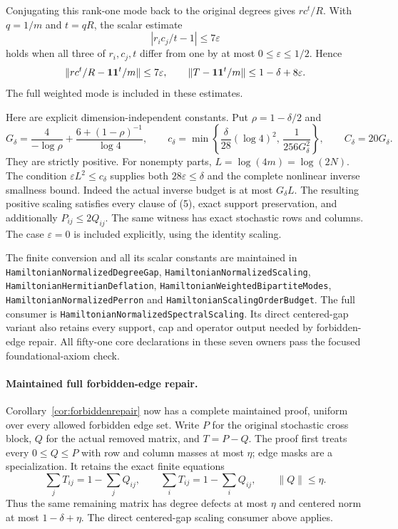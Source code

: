 Conjugating this rank-one mode back to the original degrees gives
\(rc^t/R\). With \(q=1/m\) and \(t=qR\), the scalar estimate
\[
 |r_i c_j/t-1|\leq7\varepsilon
\]
holds when all three of \(r_i,c_j,t\) differ from one by at most
\(0\leq\varepsilon\leq1/2\). Hence
\[
 \|rc^t/R-\mathbf1\mathbf1^t/m\|\leq7\varepsilon,\qquad
 \|T-\mathbf1\mathbf1^t/m\|\leq1-\delta+8\varepsilon.
\]
The full weighted mode is included in these estimates.

Here are explicit dimension-independent constants.
Put \(\rho=1-\delta/2\) and
\[
 G_\delta=\frac4{-\log\rho}
           +\frac{6+(1-\rho)^{-1}}{\log4},\qquad
 c_\delta=\min\left\{
       \frac{\delta}{28}(\log4)^2,\,
       \frac1{256G_\delta^2}\right\},\qquad
 C_\delta=20G_\delta.
\]
They are strictly positive. For nonempty parts,
\(L=\log(4m)=\log(2N)\).
The condition \(\varepsilon L^2\leq c_\delta\) supplies both
\(28\varepsilon\leq\delta\) and the complete nonlinear inverse
smallness bound. Indeed the actual inverse budget is at most
\(G_\delta L\). The resulting positive scaling satisfies every
clause of (5), exact support preservation, and additionally
\(P_{ij}\leq2Q_{ij}\).
The same witness has exact stochastic rows and columns.
The case \(\varepsilon=0\) is included explicitly, using the
identity scaling.

The finite conversion and all its scalar constants are maintained in
\texttt{HamiltonianNormalizedDegreeGap},
\texttt{HamiltonianNormalizedScaling},
\texttt{HamiltonianHermitianDeflation},
\texttt{HamiltonianWeightedBipartiteModes},
\texttt{HamiltonianNormalizedPerron} and
\texttt{HamiltonianScalingOrderBudget}.
The full consumer is
\texttt{HamiltonianNormalizedSpectralScaling}.
Its direct centered-gap variant also retains every support, cap
and operator output needed by forbidden-edge repair.
All fifty-one core declarations in these seven owners pass the
focused foundational-axiom check.

\paragraph{Maintained full forbidden-edge repair.}
Corollary~\ref{cor:forbiddenrepair} now has a complete maintained
proof, uniform over every allowed forbidden edge set.
Write \(P\) for the original stochastic cross block, \(Q\) for
the actual removed matrix, and \(T=P-Q\).
The proof first treats every \(0\leq Q\leq P\) with row and
column masses at most \(\eta\); edge masks are a specialization.
It retains the exact finite equations
\[
 \sum_jT_{ij}=1-\sum_jQ_{ij},\qquad
 \sum_iT_{ij}=1-\sum_iQ_{ij},\qquad
 \|Q\|\leq\eta.
\]
Thus the same remaining matrix has degree defects at most \(\eta\)
and centered norm at most \(1-\delta+\eta\).
The direct centered-gap scaling consumer above applies.

